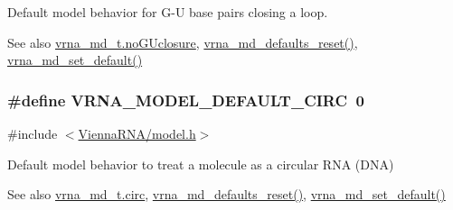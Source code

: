 Default model behavior for G-\/U base pairs closing a loop. 

\begin{DoxySeeAlso}{See also}
\hyperlink{structvrna__md__s_a7e883db1f33f8f3baa5c9b140350c78e}{vrna\+\_\+md\+\_\+t.\+no\+G\+Uclosure}, \hyperlink{group__model__details_ga70834424cf804d149937de89f80ceb45}{vrna\+\_\+md\+\_\+defaults\+\_\+reset()}, \hyperlink{group__model__details_ga8ac6ff84936282436f822644bf841f66}{vrna\+\_\+md\+\_\+set\+\_\+default()} 
\end{DoxySeeAlso}
\subsubsection[{\texorpdfstring{V\+R\+N\+A\+\_\+\+M\+O\+D\+E\+L\+\_\+\+D\+E\+F\+A\+U\+L\+T\+\_\+\+C\+I\+RC}{VRNA_MODEL_DEFAULT_CIRC}}]{\setlength{\rightskip}{0pt plus 5cm}\#define V\+R\+N\+A\+\_\+\+M\+O\+D\+E\+L\+\_\+\+D\+E\+F\+A\+U\+L\+T\+\_\+\+C\+I\+RC~0}\hypertarget{group__model__details_ga22059033db7bcd875c51fec32425490a}{}\label{group__model__details_ga22059033db7bcd875c51fec32425490a}


{\ttfamily \#include $<$\hyperlink{model_8h}{Vienna\+R\+N\+A/model.\+h}$>$}



Default model behavior to treat a molecule as a circular R\+NA (D\+NA) 

\begin{DoxySeeAlso}{See also}
\hyperlink{structvrna__md__s_a92762e1008503d4623ff5c01e358a464}{vrna\+\_\+md\+\_\+t.\+circ}, \hyperlink{group__model__details_ga70834424cf804d149937de89f80ceb45}{vrna\+\_\+md\+\_\+defaults\+\_\+reset()}, \hyperlink{group__model__details_ga8ac6ff84936282436f822644bf841f66}{vrna\+\_\+md\+\_\+set\+\_\+default()} 
\end{DoxySeeAlso}
